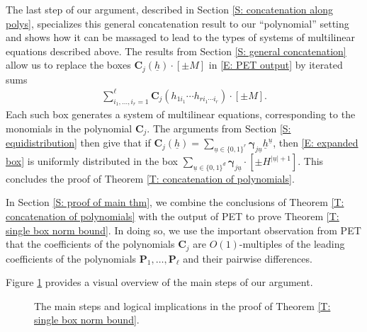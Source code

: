 \documentclass[11pt]{amsart}
\theoremstyle{definition}
\newcommand{\bc}{{\mathbf{C}}}
\newcommand{\bp}{{\mathbf{P}}}
\newcommand{\bgamma}{{\boldsymbol{\gamma}}}
\newcommand{\uh}{{\underline{h}}}
\newcommand{\uu}{{\underline{u}}}
\begin{document}
The last step of our argument, described in Section \ref{S: concatenation along polys}, specializes this general concatenation result to our ``polynomial'' setting and shows how it can be massaged to lead to the types of systems of multilinear equations described above. The results from Section \ref{S: general concatenation} allow us to replace the boxes $\bc_j(\uh)\cdot[\pm M]$ in \eqref{E: PET output} by iterated sums
\begin{align}\label{E: expanded box}
    \sum_{i_1, \ldots, i_r = 1}^\ell \bc_j(h_{1i_1}\cdots h_{ri_1\cdots i_r})\cdot[\pm M].
\end{align}
Each such box generates a system of multilinear equations, corresponding to the monomials in the polynomial $\bc_j$. The arguments from Section \ref{S: equidistribution} then give that if $\bc_j(\uh)= \sum\limits_{\uu\in\{0,1\}^r} \bgamma_{j\uu}\uh^\uu$, then \eqref{E: expanded box} is uniformly distributed in the box $\sum\limits_{\uu\in\{0,1\}^d}\bgamma_{j\uu}\cdot [\pm H^{|\uu|+1}]$. This concludes the proof of Theorem \ref{T: concatenation of polynomials}. 

In Section \ref{S: proof of main thm}, we combine the conclusions of Theorem \ref{T: concatenation of polynomials} with the output of PET to prove Theorem \ref{T: single box norm bound}. In doing so, we use the important observation from PET that the coefficients of the polynomials $\bc_j$ are $O(1)$-multiples of the leading coefficients of the polynomials $\bp_1, \ldots, \bp_\ell$ and their pairwise differences.

Figure \ref{fig:flowchart} provides a visual overview of the main steps of our argument.

\begin{figure}[ht]
  \centering
{}

    \caption{The main steps and logical implications in the proof of Theorem \ref{T: single box norm bound}.}\label{fig:flowchart}
\end{figure}
\end{document}

